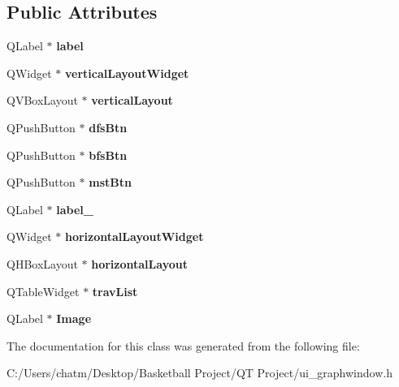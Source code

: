 \subsection*{Public Attributes}
\begin{DoxyCompactItemize}
\item 
\mbox{\label{class_ui___graph_window_a9feab4c66172809df2f835d6b542d6e7}} 
Q\+Label $\ast$ {\bfseries label}
\item 
\mbox{\label{class_ui___graph_window_a247a2db49c6d041b5809155825f8733f}} 
Q\+Widget $\ast$ {\bfseries vertical\+Layout\+Widget}
\item 
\mbox{\label{class_ui___graph_window_a4892d4a4619b8e85e2307930cb2bc648}} 
Q\+V\+Box\+Layout $\ast$ {\bfseries vertical\+Layout}
\item 
\mbox{\label{class_ui___graph_window_a46d9c40382ab395b2a9dea708e686b1f}} 
Q\+Push\+Button $\ast$ {\bfseries dfs\+Btn}
\item 
\mbox{\label{class_ui___graph_window_ae3c3aa5097ab54daf12506da9d9e2f6d}} 
Q\+Push\+Button $\ast$ {\bfseries bfs\+Btn}
\item 
\mbox{\label{class_ui___graph_window_abedddd1c478eb8d15f154c77acd925d2}} 
Q\+Push\+Button $\ast$ {\bfseries mst\+Btn}
\item 
\mbox{\label{class_ui___graph_window_a3d09c788d713408844c43c78b317a7d1}} 
Q\+Label $\ast$ {\bfseries label\+\_}
\item 
\mbox{\label{class_ui___graph_window_af47018219014c37ebd82b28699bc928d}} 
Q\+Widget $\ast$ {\bfseries horizontal\+Layout\+Widget}
\item 
\mbox{\label{class_ui___graph_window_aebf9fb1ef4b72d4f6224251a447a2863}} 
Q\+H\+Box\+Layout $\ast$ {\bfseries horizontal\+Layout}
\item 
\mbox{\label{class_ui___graph_window_accd63e1da4abc6b0f195213ac1c7c60c}} 
Q\+Table\+Widget $\ast$ {\bfseries trav\+List}
\item 
\mbox{\label{class_ui___graph_window_aed6211aa624f5f3d55784f2cec4261bd}} 
Q\+Label $\ast$ {\bfseries Image}
\end{DoxyCompactItemize}


The documentation for this class was generated from the following file\+:\begin{DoxyCompactItemize}
\item 
C\+:/\+Users/chatm/\+Desktop/\+Basketball Project/\+Q\+T Project/ui\+\_\+graphwindow.\+h\end{DoxyCompactItemize}
